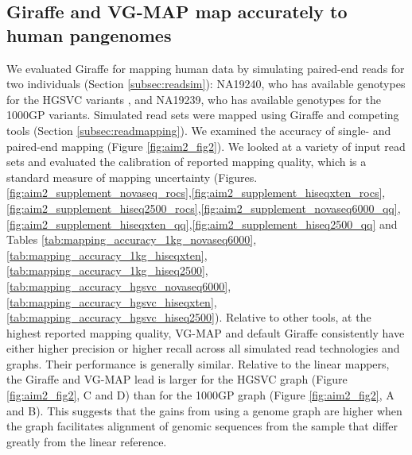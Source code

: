 \documentclass[11pt]{ucscthesis}
\begin{document}
\subsection{Giraffe and VG-MAP map accurately to human pangenomes}
We evaluated Giraffe for mapping human data by simulating paired-end reads for two individuals (Section \ref{subsec:readsim}): NA19240, who has available genotypes for the HGSVC variants \cite{chaisson_sv_2019}, and NA19239, who has available genotypes for the 1000GP variants\cite{1000gp_2015}.
Simulated read sets were mapped using Giraffe and competing tools (Section \ref{subsec:readmapping}).
We examined the accuracy of single- and paired-end mapping (Figure \ref{fig:aim2_fig2}).
We looked at a variety of input read sets and evaluated the calibration of reported mapping quality, which is a standard measure of mapping uncertainty (Figures.\ref{fig:aim2_supplement_novaseq_rocs},\ref{fig:aim2_supplement_hiseqxten_rocs},\ref{fig:aim2_supplement_hiseq2500_rocs},\ref{fig:aim2_supplement_novaseq6000_qq},\ref{fig:aim2_supplement_hiseqxten_qq},\ref{fig:aim2_supplement_hiseq2500_qq} and Tables \ref{tab:mapping_accuracy_1kg_novaseq6000},\ref{tab:mapping_accuracy_1kg_hiseqxten},\ref{tab:mapping_accuracy_1kg_hiseq2500},\ref{tab:mapping_accuracy_hgsvc_novaseq6000},\ref{tab:mapping_accuracy_hgsvc_hiseqxten},\ref{tab:mapping_accuracy_hgsvc_hiseq2500}).
Relative to other tools, at the highest reported mapping quality, VG-MAP and default Giraffe consistently have either higher precision or higher recall across all simulated read technologies and graphs.
Their performance is generally similar.
Relative to the linear mappers, the Giraffe and VG-MAP lead is larger for the HGSVC graph (Figure \ref{fig:aim2_fig2}, C and D) than for the 1000GP graph (Figure \ref{fig:aim2_fig2}, A and B).
This suggests that the gains from using a genome graph are higher when the graph facilitates alignment of genomic sequences from the sample that differ greatly from the linear reference.
\end{document}
